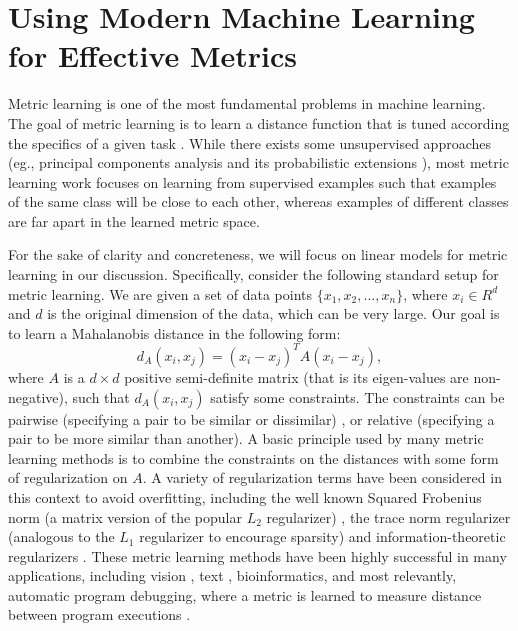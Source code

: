 \section{Using Modern Machine Learning for Effective Metrics}
Metric learning is one of the most fundamental problems in machine learning. The goal of metric learning is to learn a distance function that is tuned according the specifics of a given task \cite{kulis2012metric}. While there exists some unsupervised approaches (eg., principal components analysis and its probabilistic extensions \cite{scholkopf1998nonlinear,tipping1999probabilistic,}), most metric learning work focuses on learning from supervised examples such that examples of the same class will be close to each other, whereas examples of different classes are far apart in the learned metric space.

For the sake of clarity and concreteness, we will focus on linear models for metric learning in our discussion. Specifically, consider the following standard setup for metric learning. We are given a set of data points $\{x_1, x_2, ...,x_n\}$, where $x_i \in R^d$ and $d$ is the original dimension of the data, which can be very large. Our goal is to learn a Mahalanobis distance in the following form: \[d_A(x_i, x_j) = (x_i-x_j)^TA(x_i-x_j),\]
where $A$ is a $d\times d$ positive semi-definite matrix (that is its eigen-values are non-negative), such that $d_A(x_i, x_j)$ satisfy some constraints. The constraints can be pairwise (specifying a pair to be similar or dissimilar) \cite{xing2002distance,bilenko2004integrating,davis2007information}, or relative (specifying a pair to be more similar than another)\cite{schultz2004learning,rosales2006learning}.  A basic principle used by many metric learning methods is to combine the constraints on the distances with some form of regularization on $A$. A variety of regularization terms have been considered in this context to avoid overfitting, including the well known Squared Frobenius norm (a matrix version of the popular $L_2$ regularizer) \cite{schultz2004learning,kwok2003learning} , the trace norm regularizer (analogous to the $L_1$ regularizer to encourage sparsity) \cite{jain2010inductive,} and information-theoretic regularizers \cite{davis2007information}. These metric learning methods have been highly successful in many applications, including vision \cite{hoi2006learning,frome2007learning,guillaumin2009you}, text \cite{davis2008structured}, bioinformatics\cite{xiong2006kernel}, and most relevantly, automatic program debugging, where a metric is learned to measure distance between program executions \cite{davis2007information}.

